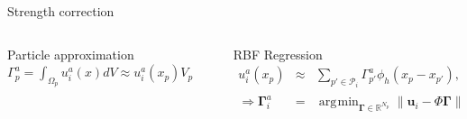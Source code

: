 \documentclass[aspectratio=169]{beamer} %
\DeclareMathOperator*{\argmin}{\arg\!\min}
\begin{document}
\begin{frame}{Strength correction}
    \begin{columns}[t]
        \begin{column}{0.4\textwidth}
            \begin{exampleblock}{Particle approximation}
                $\Gamma^a_p = \int_{\Omega_p} u^a_i(x) dV \approx u^a_i(x_p) V_p$
            \end{exampleblock}
        \end{column}
        \begin{column}{0.6\textwidth}
            \begin{exampleblock}{RBF Regression}
                \begin{eqnarray*}
                    u^a_i(x_p) &\approx& \sum_{p' \in \mathcal P_i} \Gamma^a_{p'} \phi_h(x_p - x_{p'}), \quad p \in \mathcal P_i \Rightarrow \bm u_i \approx \Phi \bm \Gamma_i\\
                    \Rightarrow \bm \Gamma_i^a &=& \argmin_{\bm \Gamma \in \mathbb R^{N_p}} \| \bm u_i - \Phi \bm \Gamma\|_2^2 + R(\bm \Gamma)
                \end{eqnarray*}
            \end{exampleblock}
        \end{column}
    \end{columns}
\end{frame}
\end{document}
